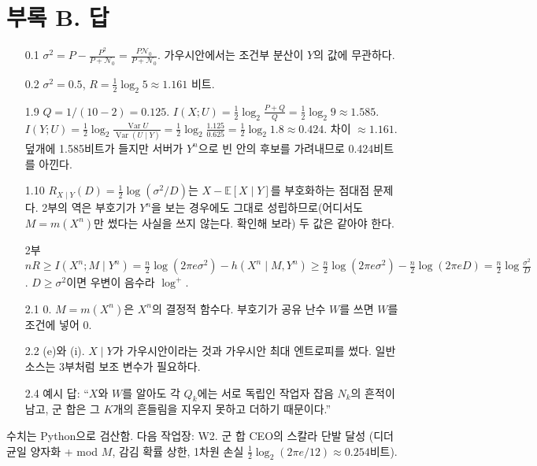 \documentclass[11pt,a4paper]{article}
\newcommand{\Var}{\operatorname{Var}}
\newcommand{\E}{\mathbb{E}}
\begin{document}
\section*{부록 B. 답}
\begin{itemize}[leftmargin=2.2em]
\item[0.1] $\sigma^2=P-\frac{P^2}{P+\mathcal N_0}=\frac{P\mathcal N_0}{P+\mathcal N_0}$. 가우시안에서는 조건부 분산이 $Y$의 값에 무관하다.
\item[0.2] $\sigma^2=0.5$, $R=\frac12\log_2 5\approx1.161$ 비트.
\item[1.9] $Q=1/(10-2)=0.125$. $I(X;U)=\frac12\log_2\frac{P+Q}{Q}=\frac12\log_2 9\approx1.585$. $I(Y;U)=\frac12\log_2\frac{\Var U}{\Var(U\mid Y)}=\frac12\log_2\frac{1.125}{0.625}=\frac12\log_2 1.8\approx0.424$. 차이 $\approx1.161$. 덮개에 1.585비트가 들지만 서버가 $Y^n$으로 빈 안의 후보를 가려내므로 0.424비트를 아낀다.
\item[1.10] $R_{X\mid Y}(D)=\frac12\log(\sigma^2/D)$는 $X-\E[X\mid Y]$를 부호화하는 점대점 문제다. 2부의 역은 부호기가 $Y^n$을 보는 경우에도 그대로 성립하므로(어디서도 $M=m(X^n)$만 썼다는 사실을 쓰지 않는다. 확인해 보라) 두 값은 같아야 한다.
\item[2부] $nR\ge I(X^n;M\mid Y^n)=\frac n2\log(2\pi e\sigma^2)-h(X^n\mid M,Y^n)\ge\frac n2\log(2\pi e\sigma^2)-\frac n2\log(2\pi eD)=\frac n2\log\frac{\sigma^2}{D}$. $D\ge\sigma^2$이면 우변이 음수라 $\log^+$.
\item[2.1] $0$. $M=m(X^n)$은 $X^n$의 결정적 함수다. 부호기가 공유 난수 $W$를 쓰면 $W$를 조건에 넣어 $0$.
\item[2.2] (e)와 (i). $X\mid Y$가 가우시안이라는 것과 가우시안 최대 엔트로피를 썼다. 일반 소스는 3부처럼 보조 변수가 필요하다.
\item[2.4] 예시 답: “$X$와 $W$를 알아도 각 $Q_k$에는 서로 독립인 작업자 잡음 $N_k$의 흔적이 남고, 군 합은 그 $K$개의 흔들림을 지우지 못하고 더하기 때문이다.”
\end{itemize}

\vspace{1em}
\small\textcolor{ink!60}{수치는 Python으로 검산함. 다음 작업장: W2. 군 합 CEO의 스칼라 단발 달성 (디더 균일 양자화 + mod $M$, 감김 확률 상한, 1차원 손실 $\tfrac12\log_2(2\pi e/12)\approx0.254$비트).}
\end{document}
